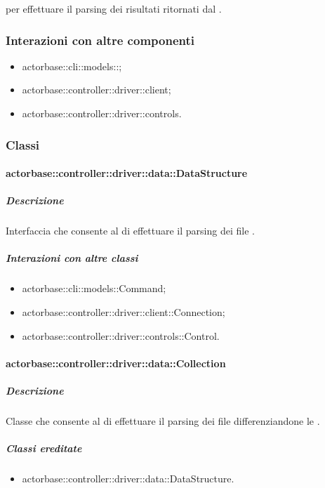 \documentclass{scalatekids-article}
\begin{document}
 per effettuare il parsing dei risultati ritornati dal
.

\subsubsection{Interazioni con altre componenti}
\begin{itemize}
\item actorbase::cli::models::;
\item actorbase::controller::driver::client;
\item actorbase::controller::driver::controls.
\end{itemize}

\subsubsection{Classi}

\paragraph{actorbase::controller::driver::data::DataStructure}

\subparagraph{Descrizione}

Interfaccia che consente al  di effettuare il parsing dei file
.

\subparagraph{Interazioni con altre classi}

\begin{itemize}
\item actorbase::cli::models::Command;
\item actorbase::controller::driver::client::Connection;
\item actorbase::controller::driver::controls::Control.
\end{itemize}

\paragraph{actorbase::controller::driver::data::Collection}

\subparagraph{Descrizione}

Classe che consente al  di effettuare il parsing dei file
 differenziandone le .

\subparagraph{Classi ereditate}

\begin{itemize}
\item actorbase::controller::driver::data::DataStructure.
\end{itemize}
\end{document}
